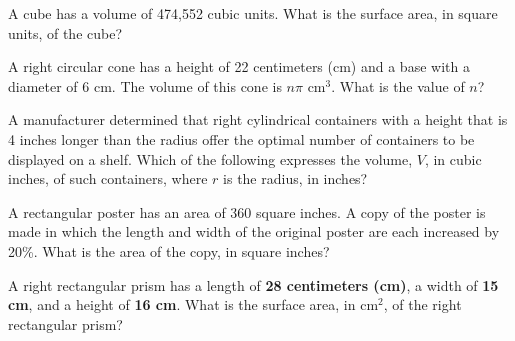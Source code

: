 A cube has a volume of 474{,}552 cubic units.  
What is the surface area, in square units, of the cube?

\vspace{0.75em}


\vspace{2em}

\noindent\markforreview
\vspace{1em}

A right circular cone has a height of 22 centimeters (cm) and a base with a diameter of 6 cm.  
The volume of this cone is $n\pi$ cm$^3$. What is the value of $n$?

\vspace{0.75em}



\vspace{2em}
\newpage
\noindent\markforreview
\vspace{1em}

A manufacturer determined that right cylindrical containers with a height that is 4 inches longer than the radius  
offer the optimal number of containers to be displayed on a shelf.  
Which of the following expresses the volume, $V$, in cubic inches, of such containers, where $r$ is the radius, in inches?

\vspace{0.75em}


\vspace{2em}

\noindent\markforreview
\vspace{1em}

A rectangular poster has an area of 360 square inches.  
A copy of the poster is made in which the length and width of the original poster are each increased by 20\%.  
What is the area of the copy, in square inches?

\vspace{0.75em}

\vspace{2em}

\noindent\markforreview
\vspace{1em}

A right rectangular prism has a length of \textbf{28 centimeters (cm)},  
a width of \textbf{15 cm}, and a height of \textbf{16 cm}.  
What is the surface area, in cm$^2$, of the right rectangular prism?

